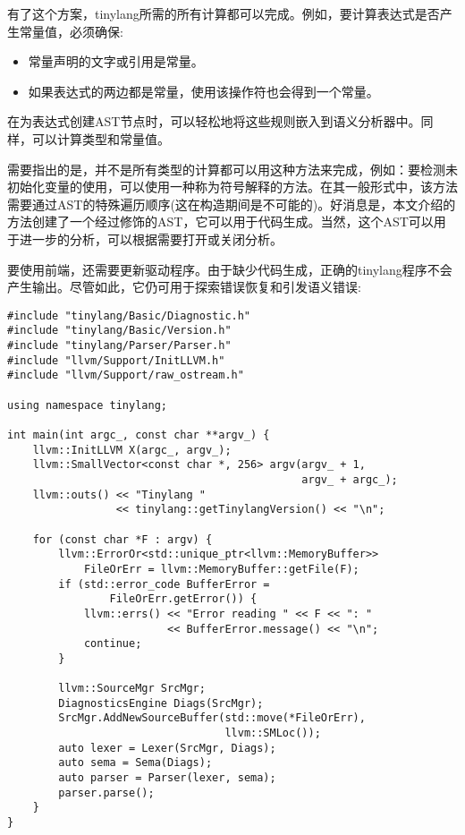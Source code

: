 有了这个方案，tinylang所需的所有计算都可以完成。例如，要计算表达式是否产生常量值，必须确保:\par

\begin{itemize}
\item 常量声明的文字或引用是常量。
\item 如果表达式的两边都是常量，使用该操作符也会得到一个常量。
\end{itemize}

在为表达式创建AST节点时，可以轻松地将这些规则嵌入到语义分析器中。同样，可以计算类型和常量值。\par

需要指出的是，并不是所有类型的计算都可以用这种方法来完成，例如：要检测未初始化变量的使用，可以使用一种称为符号解释的方法。在其一般形式中，该方法需要通过AST的特殊遍历顺序(这在构造期间是不可能的)。好消息是，本文介绍的方法创建了一个经过修饰的AST，它可以用于代码生成。当然，这个AST可以用于进一步的分析，可以根据需要打开或关闭分析。\par

要使用前端，还需要更新驱动程序。由于缺少代码生成，正确的tinylang程序不会产生输出。尽管如此，它仍可用于探索错误恢复和引发语义错误:\par

\begin{lstlisting}[caption={}]
#include "tinylang/Basic/Diagnostic.h"
#include "tinylang/Basic/Version.h"
#include "tinylang/Parser/Parser.h"
#include "llvm/Support/InitLLVM.h"
#include "llvm/Support/raw_ostream.h"

using namespace tinylang;

int main(int argc_, const char **argv_) {
	llvm::InitLLVM X(argc_, argv_);
	llvm::SmallVector<const char *, 256> argv(argv_ + 1,
											  argv_ + argc_);
	llvm::outs() << "Tinylang "
	 			 << tinylang::getTinylangVersion() << "\n";
	 			 
	for (const char *F : argv) {
		llvm::ErrorOr<std::unique_ptr<llvm::MemoryBuffer>>
			FileOrErr = llvm::MemoryBuffer::getFile(F);
		if (std::error_code BufferError =
				FileOrErr.getError()) {
			llvm::errs() << "Error reading " << F << ": "
						 << BufferError.message() << "\n";
			continue;
		}
	
		llvm::SourceMgr SrcMgr;
		DiagnosticsEngine Diags(SrcMgr);
		SrcMgr.AddNewSourceBuffer(std::move(*FileOrErr),
								  llvm::SMLoc());
		auto lexer = Lexer(SrcMgr, Diags);
		auto sema = Sema(Diags);
		auto parser = Parser(lexer, sema);
		parser.parse();
	}
}
\end{lstlisting}

